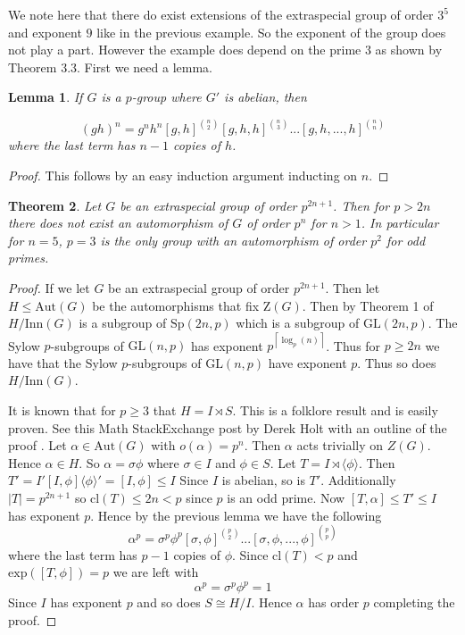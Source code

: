 \documentclass[]{amsart}
\newtheorem{theorem}{Theorem}[section]
\newtheorem{lemma}[theorem]{Lemma}
\theoremstyle{definition}
\theoremstyle{definition}
\theoremstyle{definition}
\theoremstyle{definition}
\theoremstyle{remark}
\theoremstyle{remark}
\newcommand{\abs}[1]{\left\lvert{#1}\right\rvert}
\newcommand{\ceil}[1]{\left\lceil {#1} \right\rceil}
\begin{document}
        We note here that there do exist extensions of the extraspecial group of order $3^5$ and exponent $9$ like in the previous example. So the exponent of the group does not play a part. However the example does depend on the prime $3$ as shown by Theorem 3.3. First we need a lemma.

        \begin{lemma}
            If $G$ is a $p$-group where $G'$ is abelian, then 

            \[
                (gh)^n=g^nh^n[g,h]^{\binom{n}{2}} [g,h,h]^{\binom{n}{3}}...[g,h,...,h]^{\binom{n}{n}}
            \]
            where the last term has $n-1$ copies of $h$. 
        \end{lemma}

        \begin{proof}
            This follows by an easy induction argument inducting on $n$.
        \end{proof}


        \begin{theorem}
            Let $G$ be an extraspecial group of order $p^{2n+1}$. Then for $p> 2n$ there does not exist an automorphism of $G$ of order $p^n$ for $n>1$. In particular for $n=5$, $p=3$ is the only group with an automorphism of order $p^2$ for odd primes. 
        \end{theorem}

        \begin{proof}
            If we let $G$ be an extraspecial group of order $p^{2n+1}$. Then let $H \leq \mathrm{Aut}(G)$ be the automorphisms that fix $\mathrm{Z}(G)$. Then by Theorem 1 of \cite{Win} $H/\mathrm{Inn}(G)$ is a subgroup of $\mathrm{Sp}(2n,p)$ which is a subgroup of $\mathrm{GL} (2n,p)$. The Sylow $p$-subgroups of $\mathrm{GL} (n,p)$ has exponent $p^{\ceil{\log_p(n)}}$. Thus for $p\geq 2n$ we have that the Sylow $p$-subgroups of $\mathrm{GL} (n,p)$ have exponent $p$. Thus so does $H/\mathrm{Inn}(G)$.

            It is known that for $p\geq 3$ that $H=I\rtimes S$. This is a folklore result and is easily proven. See this Math StackExchange post by Derek Holt with an outline of the proof \cite{Holt}. Let $\alpha\in \mathrm{Aut}(G)$ with $o(\alpha)=p^n$. Then $\alpha$ acts trivially on $Z(G)$. Hence $\alpha \in H$. So $\alpha=\sigma \phi$ where $\sigma \in I$ and $\phi \in S$. Let $T=I\rtimes \langle \phi\rangle$. Then $T'=I'[I,\phi]\langle \phi\rangle'=[I,\phi]\leq I$ Since $I$ is abelian, so is $T'$. Additionally $\abs{T}=p^{2n+1}$ so $\mathrm{cl}(T)\leq 2n<p$ since $p$ is an odd prime. Now $[T,\alpha]\leq T'\leq I$ has exponent $p$. Hence by the previous lemma we have the following 
            \[
                \alpha^p=\sigma^p \phi^p [\sigma, \phi]^{\binom{p}{2}}... [\sigma, \phi, ..., \phi]^{\binom{p}{p}}
            \]
            where the last term has $p-1$ copies of $\phi$. Since $\mathrm{cl}(T)<p$ and $\mathrm{exp}([T,\phi])=p$ we are left with 
            \[
                \alpha^p=\sigma^p\phi^p=1
            \]
            Since $I$ has exponent $p$ and so does $S\cong H/I$. Hence $\alpha$ has order $p$ completing the proof.
        \end{proof}
\end{document}
